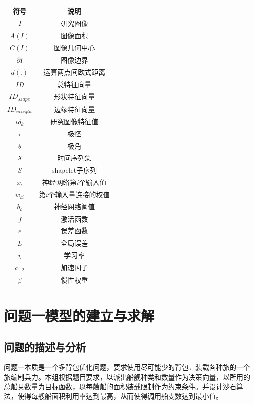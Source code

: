 \documentclass{whutmod}
\begin{document}
	\begin{table}[H]
	\label{biao} \centering
		\begin{tabular}{cc}
			\toprule[1.5pt]
			\multicolumn{1}{m{5cm}}{\centering 符号} & \multicolumn{1}{m{5cm}}{\centering 说明} \\
			\midrule[1pt]
			$I$  &  研究图像 \\ 
			$A(I)$  &  图像面积 \\ 
			$C(I)$  & 图像几何中心\\
			$\partial I$  &  图像边界 \\ 
		    $d(.)$ & 运算两点间欧式距离\\
			$ID$	 &  总特征向量  \\ 
			$ID_{shape}$ &  形状特征向量 \\ 
			$ID_{margin}$	 &  边缘特征向量 \\ 
			$id_{k}$  &   研究图像特征值\\ 
			$r$  &  极径\\	
			$\theta$ & 极角\\
			$X$ &  时间序列集\\ 
			$S$ & shapelet子序列\\
			$x_{i}$ & 神经网络第$i$个输入值\\
			$w_{ki}$ & 第$i$个输入量连接的权值\\
			$b_{k}$ & 神经网络阈值\\
			$f$  & 激活函数\\
			$e$ & 误差函数\\
			$E$ & 全局误差\\
			$\eta $ &  学习率\\
			$c_{1,2}$ & 加速因子\\
			$\beta$ & 惯性权重\\
			

		
			\bottomrule[1.5pt]
		\end{tabular}
	\end{table}

	\section{问题一模型的建立与求解}
	\subsection{问题的描述与分析}
	问题一本质是一个多背包优化问题，要求使用尽可能少的背包，装载各种旅的一个旅编制兵力。本组根据题目要求，以派出船舰种类和数量作为决策向量，以所用的总船只数量为目标函数，以每艘船的面积装载限制作为约束条件。并设计沙石算法，使得每艘船面积利用率达到最高，从而使得调用船支数达到最小值。
\end{document}
